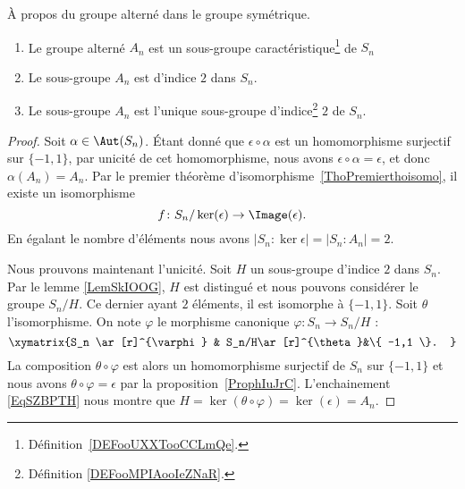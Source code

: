 \begin{proposition} \label{PROPooCPXOooVxPAij}
    À propos du groupe alterné dans le groupe symétrique.
    \begin{enumerate}
        \item
            Le groupe alterné \( A_n\) est un sous-groupe caractéristique\footnote{Définition~\ref{DEFooUXXTooCCLmQe}.} de \( S_n\)
        \item   \label{ITEMooWXXUooOWvFgE}
            Le sous-groupe \( A_n\) est d'indice \( 2\) dans \( S_n\).
        \item       \label{ITEMooGGAHooRYgNqq}
            Le sous-groupe \( A_n\) est l'unique sous-groupe d'indice\footnote{Définition \ref{DEFooMPIAooIeZNaR}.} \( 2\) de \( S_n\).
    \end{enumerate}
\end{proposition}

\begin{proof}
    Soit \( \alpha\in \Aut(S_n)\). Étant donné que \( \epsilon\circ\alpha\) est un homomorphisme surjectif sur \( \{ -1,1 \}\), par unicité de cet homomorphisme, nous avons \( \epsilon\circ\alpha=\epsilon\), et donc \( \alpha(A_n)=A_n\). Par le premier théorème d'isomorphisme~\ref{ThoPremierthoisomo}, il existe un isomorphisme
    \begin{equation}
        f\colon S_n/\ker(\epsilon)\to \Image(\epsilon).
    \end{equation}
    En égalant le nombre d'éléments nous avons \( | S_n:\ker\epsilon |=| S_n:A_n |=2\).

    Nous prouvons maintenant l'unicité. Soit \( H\) un sous-groupe d'indice \( 2\) dans \( S_n\). Par le lemme \ref{LemSkIOOG}, \( H\) est distingué et nous pouvons considérer le groupe \( S_n/H\). Ce dernier ayant \( 2\) éléments, il est isomorphe à \( \{ -1,1 \}\). Soit \( \theta\) l'isomorphisme. On note \( \varphi\) le morphisme canonique \( \varphi\colon S_n\to S_n/H\) :
    \begin{equation}    \label{EqSZBPTH}
        \xymatrix{%
        S_n \ar[r]^{\varphi}        &   S_n/H\ar[r]^{\theta}&\{ -1,1 \}.
           }
    \end{equation}
    La composition \( \theta \circ \varphi\) est alors un homomorphisme surjectif de \( S_n\) sur \( \{ -1,1 \}\) et nous avons \( \theta\circ\varphi=\epsilon\) par la proposition~\ref{ProphIuJrC}. L'enchainement \eqref{EqSZBPTH} nous montre que \( H=\ker(\theta\circ\varphi)=\ker(\epsilon)=A_n\).
\end{proof}

